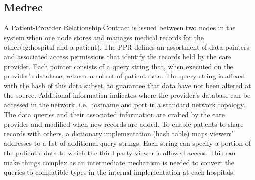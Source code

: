 \documentclass[12pt]{report}
\begin{document}
\subsection{Medrec}
\par A Patient-Provider Relationship Contract is issued between two nodes in the system when one node stores and manages medical records for the other(eg:hospital and a patient). The PPR defines an assortment of data
pointers and associated access permissions that identify the records held by the care provider. Each pointer
consists of a query string that, when executed on the provider's database, returns a subset of patient data.
The query string is affixed with the hash of this data subset, to guarantee that data have not been altered
at the source. Additional information indicates where the provider's database can be accessed in the
network, i.e. hostname and port in a standard network topology. The data queries and their associated
information are crafted by the care provider and modified when new records are added. To enable patients
to share records with others, a dictionary implementation (hash table) maps viewers’ addresses to a list of
additional query strings. Each string can specify a portion of the patient's data to which the third party
viewer is allowed access. This can make things complex as an intermediate mechanism is needed to convert the queries to compatible types in the internal implementation at each hospitals.
\end{document}
